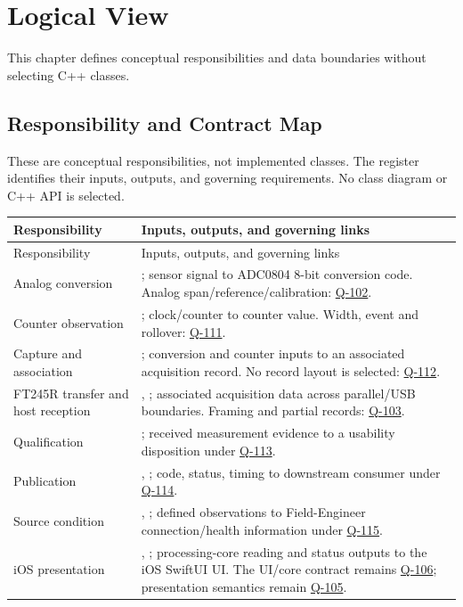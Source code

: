 \chapter{Logical View}
\label{Section:LogicalViewResponsibility}
This chapter defines conceptual responsibilities and data boundaries without selecting C++ classes.


\section{Responsibility and Contract Map}
These are conceptual responsibilities, not implemented classes. The register identifies their inputs, outputs, and governing requirements. No class diagram or C++ API is selected.

\small
\begin{tabularx}{\linewidth}{L{3.0cm}Y}
\caption{Measurement Responsibilities\label{Table:MeasurementResponsibilities}}\\
\toprule
Responsibility & Inputs, outputs, and governing links\\\midrule
\endfirsthead
\toprule
Responsibility & Inputs, outputs, and governing links\\\midrule
\endhead
\bottomrule
\endlastfoot
Analog conversion & ; sensor signal to ADC0804 8-bit conversion code. Analog span/reference/calibration: \hyperref[Question:Q-102]{Q-102}.\\
Counter observation & ; clock/counter to counter value. Width, event and rollover: \hyperref[Question:Q-111]{Q-111}.\\
Capture and association & ; conversion and counter inputs to an associated acquisition record. No record layout is selected: \hyperref[Question:Q-112]{Q-112}.\\
FT245R transfer and host reception & , ; associated acquisition data across parallel/USB boundaries. Framing and partial records: \hyperref[Question:Q-103]{Q-103}.\\
Qualification & ; received measurement evidence to a usability disposition under \hyperref[Question:Q-113]{Q-113}.\\
Publication & , ; code, status, timing to downstream consumer under \hyperref[Question:Q-114]{Q-114}.\\
Source condition & , ; defined observations to Field-Engineer connection/health information under \hyperref[Question:Q-115]{Q-115}.\\
iOS presentation & , ; processing-core reading and status outputs to the iOS SwiftUI UI. The UI/core contract remains \hyperref[Question:Q-106]{Q-106}; presentation semantics remain \hyperref[Question:Q-105]{Q-105}.\\
\end{tabularx}
\normalsize

